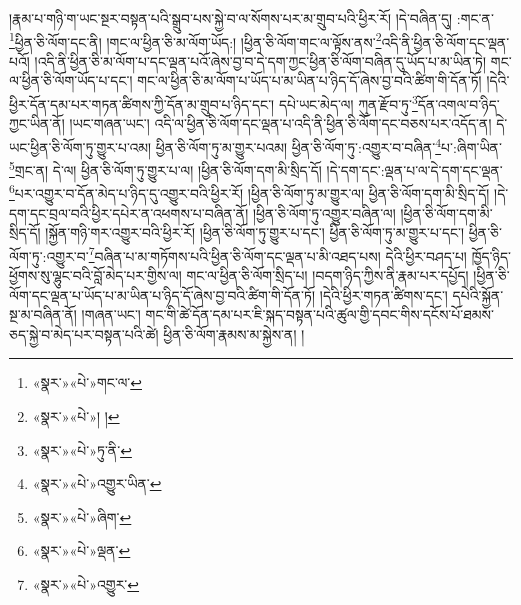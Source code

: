 །རྣམ་པ་གཉི་ག་ཡང་སྔར་བསྟན་པའི་སྒྲུབ་པས་སྐྱེ་བ་ལ་སོགས་པར་མ་གྲུབ་པའི་ཕྱིར་རོ། །དེ་བཞིན་དུ། :གང་ན་\footnote{«སྣར་»«པེ་»གང་ལ་}ཕྱིན་ཅི་ལོག་དང་ནི། །གང་ལ་ཕྱིན་ཅི་མ་ལོག་ཡོད:། །ཕྱིན་ཅི་ལོག་གང་ལ་ལྟོས་ནས་\footnote{«སྣར་»«པེ་»། །}འདི་ནི་ཕྱིན་ཅི་ལོག་དང་ལྡན་པའོ། །འདི་ནི་ཕྱིན་ཅི་མ་ལོག་པ་དང་ལྡན་པའོ་ཞེས་བྱ་བ་དེ་དག་ཀྱང་ཕྱིན་ཅི་ལོག་བཞིན་དུ་ཡོད་པ་མ་ཡིན་ཏེ། གང་ལ་ཕྱིན་ཅི་ལོག་ཡོད་པ་དང་། གང་ལ་ཕྱིན་ཅི་མ་ལོག་པ་ཡོད་པ་མ་ཡིན་པ་ཉིད་དོ་ཞེས་བྱ་བའི་ཚིག་གི་དོན་ཏོ། །དེའི་ཕྱིར་དོན་དམ་པར་གཏན་ཚིགས་ཀྱི་དོན་མ་གྲུབ་པ་ཉིད་དང་། དཔེ་ཡང་མེད་ལ། ཀུན་རྫོབ་ཏུ་\footnote{«སྣར་»«པེ་»ཏུ་ནི་}དོན་འགལ་བ་ཉིད་ཀྱང་ཡིན་ནོ། །ཡང་གཞན་ཡང་། འདི་ལ་ཕྱིན་ཅི་ལོག་དང་ལྡན་པ་འདི་ནི་ཕྱིན་ཅི་ལོག་དང་བཅས་པར་འདོད་ན། དེ་ཡང་ཕྱིན་ཅི་ལོག་ཏུ་གྱུར་པ་འམ། ཕྱིན་ཅི་ལོག་ཏུ་མ་གྱུར་པའམ། ཕྱིན་ཅི་ལོག་ཏུ་:འགྱུར་བ་བཞིན་\footnote{«སྣར་»«པེ་»འགྱུར་ཡིན་}པ་:ཞིག་ཡིན་\footnote{«སྣར་»«པེ་»ཞིག་}གྲང་ན། དེ་ལ། ཕྱིན་ཅི་ལོག་ཏུ་གྱུར་པ་ལ། །ཕྱིན་ཅི་ལོག་དག་མི་སྲིད་དོ། །དེ་དག་དང་:ལྡན་པ་ལ་དེ་དག་དང་ལྡན་\footnote{«སྣར་»«པེ་»ལྡན་}པར་འགྱུར་བ་དོན་མེད་པ་ཉིད་དུ་འགྱུར་བའི་ཕྱིར་རོ། །ཕྱིན་ཅི་ལོག་ཏུ་མ་གྱུར་ལ། ཕྱིན་ཅི་ལོག་དག་མི་སྲིད་དོ། །དེ་དག་དང་བྲལ་བའི་ཕྱིར་དཔེར་ན་འཕགས་པ་བཞིན་ནོ། །ཕྱིན་ཅི་ལོག་ཏུ་འགྱུར་བཞིན་ལ། །ཕྱིན་ཅི་ལོག་དག་མི་སྲིད་དོ། །སྐྱོན་གཉི་གར་འགྱུར་བའི་ཕྱིར་རོ། །ཕྱིན་ཅི་ལོག་ཏུ་གྱུར་པ་དང་། ཕྱིན་ཅི་ལོག་ཏུ་མ་གྱུར་པ་དང་། ཕྱིན་ཅི་ལོག་ཏུ་:འགྱུར་བ་\footnote{«སྣར་»«པེ་»འགྱུར་}བཞིན་པ་མ་གཏོགས་པའི་ཕྱིན་ཅི་ལོག་དང་ལྡན་པ་མི་འཐད་པས། དེའི་ཕྱིར་བཤད་པ། ཁྱོད་ཉིད་ཕྱོགས་སུ་ལྷུང་བའི་བློ་མེད་པར་གྱིས་ལ། གང་ལ་ཕྱིན་ཅི་ལོག་སྲིད་པ། །བདག་ཉིད་ཀྱིས་ནི་རྣམ་པར་དཔྱོད། །ཕྱིན་ཅི་ལོག་དང་ལྡན་པ་ཡོད་པ་མ་ཡིན་པ་ཉིད་དོ་ཞེས་བྱ་བའི་ཚིག་གི་དོན་ཏོ། །དེའི་ཕྱིར་གཏན་ཚིགས་དང་། དཔེའི་སྐྱོན་སྔ་མ་བཞིན་ནོ། །གཞན་ཡང་། གང་གི་ཚེ་དོན་དམ་པར་ཇི་སྐད་བསྟན་པའི་ཚུལ་གྱི་དབང་གིས་དངོས་པོ་ཐམས་ཅད་སྐྱེ་བ་མེད་པར་བསྟན་པའི་ཚེ། ཕྱིན་ཅི་ལོག་རྣམས་མ་སྐྱེས་ན། །
